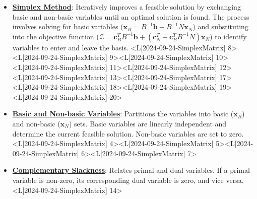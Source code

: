 \documentclass{article}%
\begin{document}
\begin{itemize}[[leftmargin=*]]%
\item \href{https://www.math.purdue.edu/~yipn/421/2024-09-24-SimplexMatrix.pdf#page=8}{\textbf{Simplex Method}}: Iteratively improves a feasible solution by exchanging basic and non-basic variables until an optimal solution is found. The process involves solving for basic variables ($\mathbf{x}_B = B^{-1}\mathbf{b} - B^{-1}N\mathbf{x}_N$) and substituting into the objective function ($\mathcal{Z} = \mathbf{c}_B^T B^{-1} \mathbf{b} + (\mathbf{c}_N^T - \mathbf{c}_B^T B^{-1} N) \mathbf{x}_N$) to identify variables to enter and leave the basis. <L[2024-09-24-SimplexMatrix] 8><L[2024-09-24-SimplexMatrix] 9><L[2024-09-24-SimplexMatrix] 10><L[2024-09-24-SimplexMatrix] 11><L[2024-09-24-SimplexMatrix] 12><L[2024-09-24-SimplexMatrix] 13><L[2024-09-24-SimplexMatrix] 17><L[2024-09-24-SimplexMatrix] 18><L[2024-09-24-SimplexMatrix] 19><L[2024-09-24-SimplexMatrix] 20>%
\item \href{https://www.math.purdue.edu/~yipn/421/2024-09-24-SimplexMatrix.pdf#page=4}{\textbf{Basic and Non{-}basic Variables}}: Partitions the variables into basic ($\mathbf{x}_B$) and non-basic ($\mathbf{x}_N$) sets. Basic variables are linearly independent and determine the current feasible solution. Non-basic variables are set to zero. <L[2024-09-24-SimplexMatrix] 4><L[2024-09-24-SimplexMatrix] 5><L[2024-09-24-SimplexMatrix] 6><L[2024-09-24-SimplexMatrix] 7>%
\item \href{https://www.math.purdue.edu/~yipn/421/2024-09-24-SimplexMatrix.pdf#page=14}{\textbf{Complementary Slackness}}: Relates primal and dual variables. If a primal variable is non-zero, its corresponding dual variable is zero, and vice versa. <L[2024-09-24-SimplexMatrix] 14>%
\end{itemize}%
\end{document}
